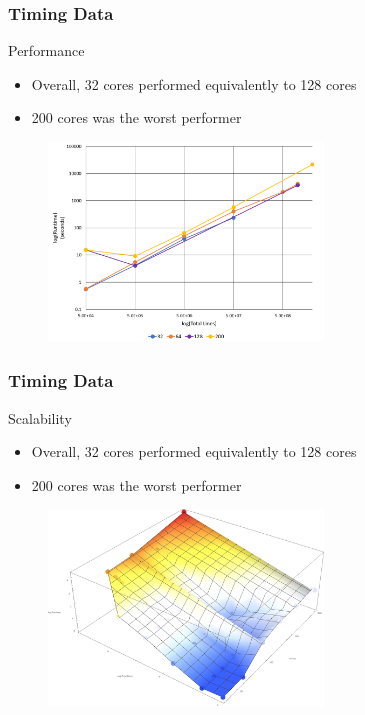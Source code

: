 \documentclass[usernames,dvipsnames]{beamer}
\begin{document}

\begin{frame}[fragile]	
	\frametitle{Timing Data}
	
        	\begin{block}{Performance}
        		\begin{itemize}
        			\item Overall, 32 cores performed equivalently to 128 cores
        			\item 200 cores was the worst performer
        		\end{itemize}
        	\end{block}
        	\begin{figure}
            \centering
	        \includegraphics[width=0.65\textwidth]{images/Runtime2.png}
	        \end{figure}
\end{frame}


\begin{frame}[fragile]	
	\frametitle{Timing Data}
	
        	\begin{block}{Scalability}
        		\begin{itemize}
        			\item Overall, 32 cores performed equivalently to 128 cores
        			\item 200 cores was the worst performer
        		\end{itemize}
        	\end{block}
        	\begin{figure}
            \centering
	        \includegraphics[width=0.65\textwidth]{images/runtimes.png}
	        \end{figure}
\end{frame}
\end{document}
